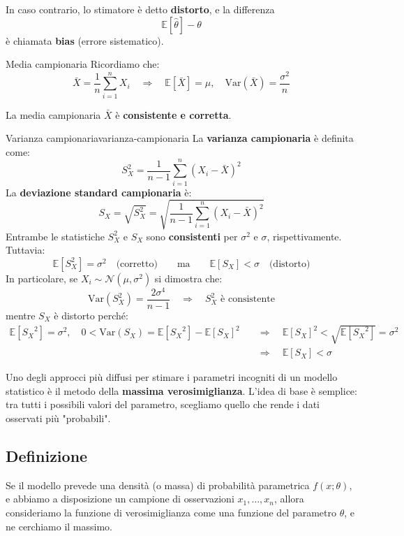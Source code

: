 In caso contrario, lo stimatore è detto \textbf{distorto}, e la differenza
\[
\mathbb{E}[\hat{\theta}] - \theta
\]
è chiamata \textbf{bias} (errore sistematico).

\begin{nota}{Media campionaria}{}
Ricordiamo che:
\[
\bar{X} = \frac{1}{n} \sum_{i=1}^n X_i
\quad \Rightarrow \quad
\mathbb{E}[\bar{X}] = \mu, \quad
\mathrm{Var}(\bar{X}) = \frac{\sigma^2}{n}
\]

La media campionaria \( \bar{X} \) è \textbf{consistente e corretta}.
\end{nota}

\begin{nota}{Varianza campionaria}{varianza-campionaria}
La \textbf{varianza campionaria} è definita come:
\[
S_X^2 = \frac{1}{n - 1} \sum_{i=1}^n (X_i - \bar{X})^2
\]
La \textbf{deviazione standard campionaria} è:
\[
S_X = \sqrt{S_X^2} = \sqrt{\frac{1}{n - 1} \sum_{i=1}^n (X_i - \bar{X})^2}
\]
Entrambe le statistiche \( S_X^2 \) e \( S_X \) sono \textbf{consistenti} per \( \sigma^2 \) e \( \sigma \), rispettivamente. Tuttavia:
\[
\mathbb{E}[S_X^2] = \sigma^2 \quad \text{(corretto)}
\qquad \text{ma} \qquad
\mathbb{E}[S_X] < \sigma \quad \text{(distorto)}
\]
In particolare, se \(X_i \sim \mathcal{N}(\mu, \sigma^2)\) si dimostra che:
\[
\mathrm{Var}(S_X^2) = \frac{2\sigma^4}{n-1}
\quad \Rightarrow \quad
S_X^2 \text{ è consistente}
\]
mentre \( S_X \) è distorto perché:
\begin{align*}
    \mathbb{E}[{S_X}^2] = \sigma^2 ,\quad 0 < \text{Var}(S_X) = \mathbb{E}[{S_X}^2] - {\mathbb{E}[{S_X}]}^2 \quad &\Longrightarrow \quad {\mathbb{E}[S_X]}^2 < \sqrt{\mathbb{E}[{S_X}^2]} = \sigma^2 \\
    &\Longrightarrow \quad {\mathbb{E}[S_X]} < \sigma
\end{align*}
\end{nota}

Uno degli approcci più diffusi per stimare i parametri incogniti di un modello statistico è il metodo della \textbf{massima verosimiglianza}. L'idea di base è semplice: tra tutti i possibili valori del parametro, scegliamo quello che rende i dati osservati più "probabili".

\subsection{Definizione}

Se il modello prevede una densità (o massa) di probabilità parametrica \( f(x; \theta) \), e abbiamo a disposizione un campione di osservazioni \( x_1, \dots, x_n \), allora consideriamo la funzione di verosimiglianza come una funzione del parametro \( \theta \), e ne cerchiamo il massimo.

